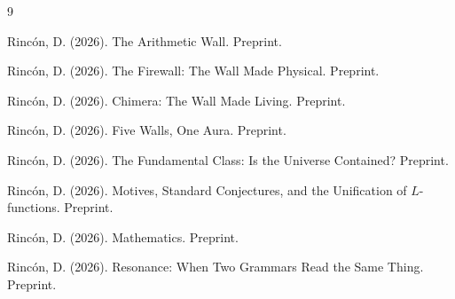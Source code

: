 \documentclass[12pt]{article}
\theoremstyle{definition}
\theoremstyle{remark}
\begin{document}
\begin{thebibliography}{9}

Rinc\'on, D. (2026).
The Arithmetic Wall. Preprint.

Rinc\'on, D. (2026).
The Firewall: The Wall Made Physical. Preprint.

Rinc\'on, D. (2026).
Chimera: The Wall Made Living. Preprint.

Rinc\'on, D. (2026).
Five Walls, One Aura. Preprint.

Rinc\'on, D. (2026).
The Fundamental Class: Is the Universe Contained? Preprint.

Rinc\'on, D. (2026).
Motives, Standard Conjectures, and the Unification of $L$-functions.
Preprint.

Rinc\'on, D. (2026).
Mathematics. Preprint.

Rinc\'on, D. (2026).
Resonance: When Two Grammars Read the Same Thing. Preprint.

\end{thebibliography}
\end{document}
